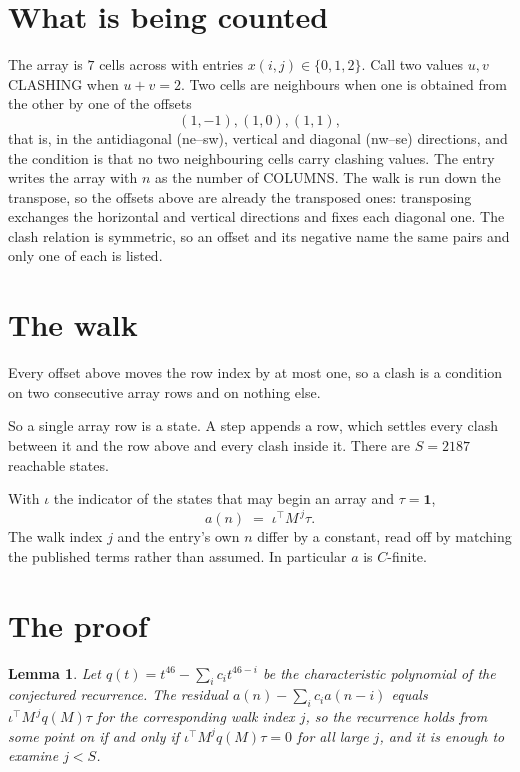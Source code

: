 \documentclass[11pt,a4paper]{article}
\theoremstyle{plain}
\newtheorem{lemma}[theorem]{Lemma}
\theoremstyle{definition}
\begin{document}
\section{What is being counted}

The array is $7$ cells across with entries $x(i,j)\in\{0,1,2\}$. Call two values $u,v$ CLASHING
when $u+v=2$. Two cells are neighbours when one is obtained from the other by one of
the offsets
\[
(1,-1), (1,0), (1,1),
\]
that is, in the antidiagonal (ne--sw), vertical and diagonal (nw--se) directions, and the condition is that no two neighbouring cells carry
clashing values. The entry writes the array with $n$ as the number of COLUMNS. The walk is run down the transpose, so the offsets above are already the transposed ones: transposing exchanges the horizontal and vertical directions and fixes each diagonal one. The clash relation is symmetric, so an offset and its negative name the
same pairs and only one of each is listed.

\section{The walk}

Every offset above moves the row index by at most one, so a clash is a condition on two
consecutive array rows and on nothing else.

So a single array row is a state. A step appends a row, which settles every clash between it
and the row above and every clash inside it. There are $S=2187$ reachable states.

With $\iota$ the indicator of the states that may begin an array and $\tau=\mathbf{1}$,
\[
a(n)\;=\;\iota^{\!\top}M^{\,j}\tau .
\]
The walk index $j$ and the entry's own $n$ differ by a constant, read off by matching the
published terms rather than assumed. In particular $a$ is $C$-finite.

\section{The proof}

\begin{lemma}\label{lem:crit}
Let $q(t)=t^{46}-\sum_i c_it^{46-i}$ be the characteristic polynomial of the
conjectured recurrence. The residual $a(n)-\sum_ic_ia(n-i)$ equals
$\iota^{\!\top}M^{\,j}q(M)\tau$ for the corresponding walk index $j$, so the recurrence
holds from some point on if and only if $\iota^{\!\top}M^{j}q(M)\tau=0$ for all large $j$,
and it is enough to examine $j<S$.
\end{lemma}
\end{document}

